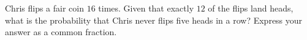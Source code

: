 Chris flips a fair coin $16$ times. Given that exactly $12$ of the flips land heads, what is the probability that Chris never flips five heads in a row? Express your answer as a common fraction.
